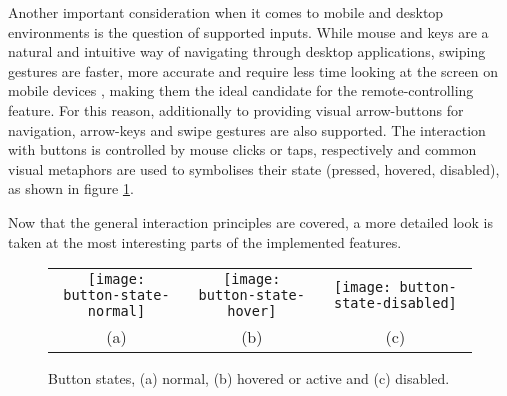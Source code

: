 Another important consideration when it comes to mobile and desktop environments is the question of supported inputs. While mouse and keys are a natural and intuitive way of navigating through desktop applications, swiping gestures are faster, more accurate \cite{Lai:SingleHandedThumbInteraction} and require less time looking at the screen on mobile devices \cite{Negulescu:TapSwipeMove}, making them the ideal candidate for the remote-controlling feature. For this reason, additionally to providing visual arrow-buttons for navigation, arrow-keys and swipe gestures are also supported. The interaction with buttons is controlled by mouse clicks or taps, respectively and common visual metaphors are used to symbolises their state (pressed, hovered, disabled), as shown in figure \ref{fig:design-interface-button}.

Now that the general interaction principles are covered, a more detailed look is taken at the most interesting parts of the implemented features.

\begin{figure}
\centering
\begin{tabular}{ccc}
\texttt{[image: button-state-normal]} &
\texttt{[image: button-state-hover]} &
\texttt{[image: button-state-disabled]} \\
(a) & (b) & (c)
\end{tabular}
\caption{Button states, (a) normal, (b) hovered or active and (c) disabled.}
\label{fig:design-interface-button}
\end{figure}

